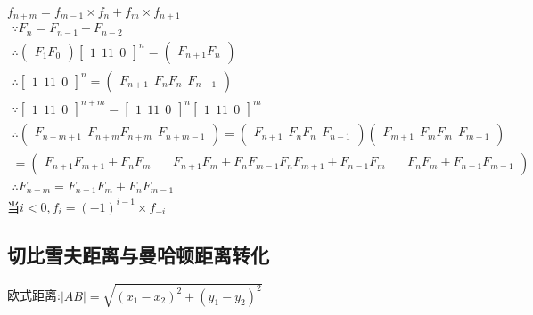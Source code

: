 \documentclass[a4paper, fontset=none]{ctexart}
\begin{document}
$f_{n+m}=f_{m-1}\times f_n+f_m\times f_{n+1}$
\[
\begin{array}{l}
\because F_n=F_{n-1}+F_{n-2} \\[3mm]
\therefore
\begin{pmatrix}F_1
F_0
\end{pmatrix}
\begin{bmatrix}
1 \ \  1
1 \ \  0
\end{bmatrix}
^n=
\begin{pmatrix}
F_{n+1}
F_n
\end{pmatrix}\\[5mm]
\therefore
\begin{bmatrix}
1 \ \  1
1 \ \  0
\end{bmatrix}
^n=
\begin{pmatrix}
F_{n+1} \ \  F_n
F_n \ \   F_{n-1}
\end{pmatrix}\\[5mm]
\because
\begin{bmatrix}
1 \ \  1
1 \ \ 0
\end{bmatrix}
^{n+m}=
\begin{bmatrix}
1 \ \  1
1 \ \  0
\end{bmatrix}^n
\begin{bmatrix}
1 \ \  1
1 \ \  0
\end{bmatrix}
^m\\[5mm]
\therefore
\begin{pmatrix}
F_{n+m+1} \ \   F_{n+m}
F_{n+m} \ \ F_{n+m-1}
\end{pmatrix}=
\begin{pmatrix}
F_{n+1} \ \ F_{n}
F_{n} \ \  F_{n-1}
\end{pmatrix}
\begin{pmatrix}
F_{m+1} \ \  F_{m}
F_{m} \ \  F_{m-1}
\end{pmatrix}\\=
\begin{pmatrix}
F_{n+1}F_{m+1}+F_nF_m \ \ \ \ \ \ \ \   F_{n+1}F_m+F_{n}F_{m-1}
F_{n}F_{m+1}+F_{n-1}F_{m} \ \ \ \ \ \ \ \  F_nF_m+F_{n-1}F_{m-1}
\end{pmatrix}\\[3mm]
\therefore F_{n+m}=F_{n+1}F_{m}+F_{n}F_{m-1}
\end{array}
\]
当$i < 0, f_i=(-1)^{i-1}\times f_{-i}$
\subsection{切比雪夫距离与曼哈顿距离转化}

欧式距离:$|AB|=\sqrt{(x_1-x_2)^2+(y_1-y_2)^2}$
\end{document}
